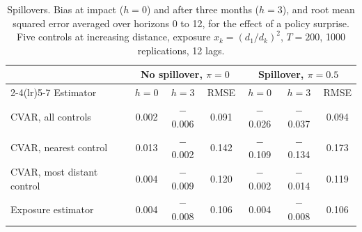 \begin{table}[H]
\centering\small
\caption{Spillovers. Bias at impact ($h=0$) and after three months ($h=3$), and root mean squared error averaged over horizons 0 to 12, for the effect of a policy surprise. Five controls at increasing distance, exposure $x_k=(d_1/d_k)^2$, $T=200$, 1000 replications, 12 lags.\label{tab:mc-spill}}
\begin{tabular}{l ccc ccc}
\toprule
 & \multicolumn{3}{c}{No spillover, $\pi=0$} & \multicolumn{3}{c}{Spillover, $\pi=0.5$}\\
\cmidrule(lr){2-4}\cmidrule(lr){5-7}
Estimator & $h=0$ & $h=3$ & RMSE & $h=0$ & $h=3$ & RMSE\\
\midrule
CVAR, all controls & 0.002 & $-$0.006 & 0.091 & $-$0.026 & $-$0.037 & 0.094\\
CVAR, nearest control & 0.013 & $-$0.002 & 0.142 & $-$0.109 & $-$0.134 & 0.173\\
CVAR, most distant control & 0.004 & $-$0.009 & 0.120 & $-$0.002 & $-$0.014 & 0.119\\
Exposure estimator & 0.004 & $-$0.008 & 0.106 & 0.004 & $-$0.008 & 0.106\\
\bottomrule
\end{tabular}
\end{table}
